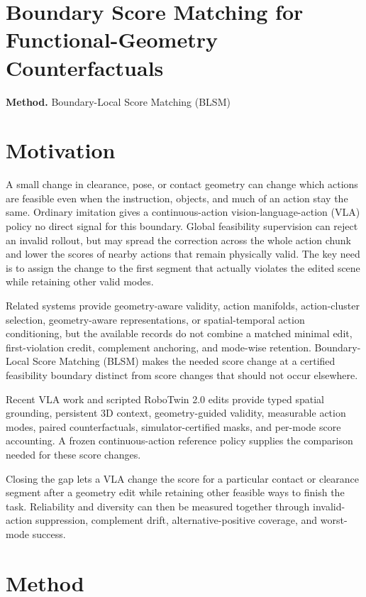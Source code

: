 \documentclass[10pt,a4paper]{article}
\begin{document}
\section*{Boundary Score Matching for Functional-Geometry Counterfactuals}
\textbf{Method.} Boundary-Local Score Matching (BLSM)
\section*{Motivation}
A small change in clearance, pose, or contact geometry can change which actions are feasible even when the instruction, objects, and much of an action stay the same. Ordinary imitation gives a continuous-action vision-language-action (VLA) policy no direct signal for this boundary. Global feasibility supervision can reject an invalid rollout, but may spread the correction across the whole action chunk and lower the scores of nearby actions that remain physically valid. The key need is to assign the change to the first segment that actually violates the edited scene while retaining other valid modes.

Related systems provide geometry-aware validity, action manifolds, action-cluster selection, geometry-aware representations, or spatial-temporal action conditioning, but the available records do not combine a matched minimal edit, first-violation credit, complement anchoring, and mode-wise retention. Boundary-Local Score Matching (BLSM) makes the needed score change at a certified feasibility boundary distinct from score changes that should not occur elsewhere.

Recent VLA work and scripted RoboTwin 2.0 edits provide typed spatial grounding, persistent 3D context, geometry-guided validity, measurable action modes, paired counterfactuals, simulator-certified masks, and per-mode score accounting. A frozen continuous-action reference policy supplies the comparison needed for these score changes.

Closing the gap lets a VLA change the score for a particular contact or clearance segment after a geometry edit while retaining other feasible ways to finish the task. Reliability and diversity can then be measured together through invalid-action suppression, complement drift, alternative-positive coverage, and worst-mode success.
\section*{Method}
\end{document}

